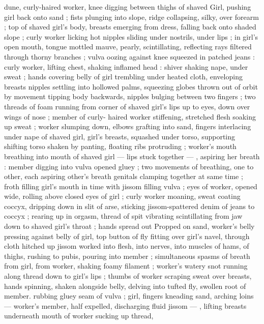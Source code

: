 {dune, curly-haired worker, knee digging between thighs of shaved 
Girl, pushing girl back onto sand ; fists plunging into slope, ridge 
collapsing, silky, over forearm ; top of shaved girl's body, breasts 
emerging from dress, falling back onto shaded slope ; curly worker 
licking hot nipples sliding under nostrils, under lips ; in girl's open 
mouth, tongue mottled mauve, pearly, scintillating, reflecting rays 
filtered through thorny branches ; vulva oozing against knee 
squeezed in patched jeans : curly worker, lifting chest, shaking 
inflamed head : shiver shaking nape, under sweat ; hands covering 
belly of girl trembling under heated cloth, enveloping breasts 
nipples settling into hollowed palms, squeezing globes thrown out of 
orbit by movement tipping body backwards, nipples bulging between 
two fingers ; two threads of foam running from corner of shaved 
girl's lips up to eyes, down over wings of nose ; member of curly- 
haired worker stiffening, stretched flesh soaking up sweat ; worker 
slumping down, elbows grafting into sand, fingers interlacing under 
nape of shaved girl, girl's breasts, squashed under torso, supporting 
shifting torso shaken by panting, floating ribs protruding ; worker's 
mouth breathing into mouth of shaved girl --- lips stuck together --- 
, aspiring her breath : member digging into vulva opened gluey ; two 
movements of breathing, one to other, each aspiring other's breath 
genitals clamping together at same time ; froth filling girl's mouth in 
time with jissom filling vulva ; eyes of worker, opened wide, rolling 
above closed eyes of girl ; curly worker moaning, sweat coating 
coccyx, dripping down in slit of arse, sticking jissom-spattered denim 
of jeans to coccyx ; rearing up in orgasm, thread of spit vibrating 
scintillating from jaw down to shaved girl's throat ; hands spread out 
Propped on sand, worker's belly pressing against belly of girl, top 
button of fly fitting over girl's navel, through cloth hitched up 
jissom worked into flesh, into nerves, into muscles of hams, of 
thighs, rushing to pubis, pouring into member ; simultaneous spasms 
of breath from girl, from worker, shaking foamy filament ; worker's 
watery snot running along thread down to girl's lips ; thumbs of 
worker scraping sweat over breasts, hands spinning, shaken 
alongside belly, delving into tufted fly, swollen root of member. 
rubbing gluey seam of vulva ; girl, fingers kneading sand, arching 
loins --- worker's member, half expelled, discharging fluid jissom --- 
, lifting breasts underneath mouth of worker sucking up thread, 
}
